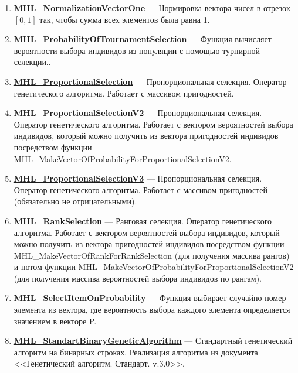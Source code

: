 \documentclass[a4paper,12pt]{article}
\begin{document}
\begin{enumerate}
\item \textbf{\hyperref[MHL_NormalizationVectorOne]{MHL\_NormalizationVectorOne}} --- Нормировка вектора чисел в отрезок $[0,1]$ так, чтобы сумма всех элементов была равна 1.

\item \textbf{\hyperref[MHL_ProbabilityOfTournamentSelection]{MHL\_ProbabilityOfTournamentSelection}} --- Функция вычисляет вероятности выбора индивидов из популяции с помощью турнирной селекции..

\item \textbf{\hyperref[MHL_ProportionalSelection]{MHL\_ProportionalSelection}} --- Пропорциональная селекция. Оператор генетического алгоритма. Работает с массивом пригодностей.

\item \textbf{\hyperref[MHL_ProportionalSelectionV2]{MHL\_ProportionalSelectionV2}} --- Пропорциональная селекция. Оператор генетического алгоритма. Работает с вектором вероятностей выбора индивидов, который можно получить из вектора пригодностей индивидов посредством функции MHL\_MakeVectorOfProbabilityForProportionalSelectionV2.

\item \textbf{\hyperref[MHL_ProportionalSelectionV3]{MHL\_ProportionalSelectionV3}} --- Пропорциональная селекция. Оператор генетического алгоритма. Работает с массивом пригодностей (обязательно не отрицательными).

\item \textbf{\hyperref[MHL_RankSelection]{MHL\_RankSelection}} --- Ранговая селекция. Оператор генетического алгоритма. Работает с вектором вероятностей выбора индивидов, который можно получить из вектора пригодностей индивидов посредством функции MHL\_MakeVectorOfRankForRankSelection (для получения массива рангов) и потом функции MHL\_MakeVectorOfProbabilityForProportionalSelectionV2 (для получения массива вероятностей выбора индивидов по рангам).

\item \textbf{\hyperref[MHL_SelectItemOnProbability]{MHL\_SelectItemOnProbability}} --- Функция выбирает случайно номер элемента из вектора, где вероятность выбора каждого элемента определяется значением в векторе P.

\item \textbf{\hyperref[MHL_StandartBinaryGeneticAlgorithm]{MHL\_StandartBinaryGeneticAlgorithm}} --- Стандартный генетический алгоритм на бинарных строках. Реализация алгоритма из документа <<Генетический алгоритм. Стандарт. v.3.0>>.


\end{enumerate}
\end{document}
